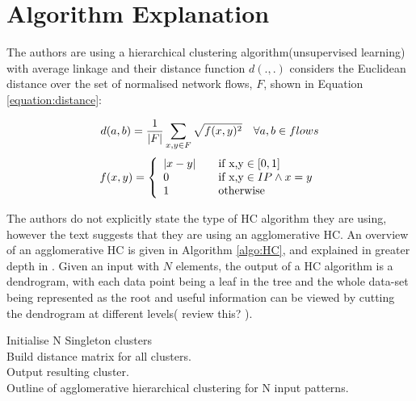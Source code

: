 \documentclass[12pt,a4paper,twocolumn]{article}
\begin{document}
	\section{Algorithm Explanation}
	The authors are using a hierarchical clustering algorithm(unsupervised learning) with average linkage and their distance function $d(.,.)$ considers the Euclidean distance over the set of normalised network flows, $F$, shown in Equation \ref{equation:distance}:
	
\begin{equation}
d(a,b) = \frac{1}{|F|} \sum_{x,y \in F} \sqrt{f(x,y)^2} \quad \forall a,b \in flows\\
\label{equation:distance}
\end{equation}
\begin{equation*}
f(x,y) = \left\{ 
        \begin{array}{l l}
            |x-y| & \quad \text{if x,y} \in [0,1]\\
            0 & \quad \text{if x,y} \in IP \wedge x = y\\
            1 & \quad \text{otherwise}\\
        \end{array} \right.
\end{equation*}
	
	The authors do not explicitly state the type of HC algorithm they are using, however the text suggests that they are using an agglomerative HC. An overview of an agglomerative HC is given in Algorithm \ref{algo:HC}, and explained in greater depth in \citep{survey}. Given an input with $N$ elements, the output of a HC algorithm is a dendrogram, with each data point being a leaf in the tree and the whole data-set being represented as the root and useful information can be viewed by cutting the dendrogram at different levels( review this? ).
	
\begin{algorithm}
Initialise N Singleton clusters\\
Build distance matrix for all clusters.\\
Output resulting cluster.\\

\caption{Outline of agglomerative hierarchical clustering for N input patterns.}
\label{algo:HC}
\end{algorithm}	
	
\end{document}
